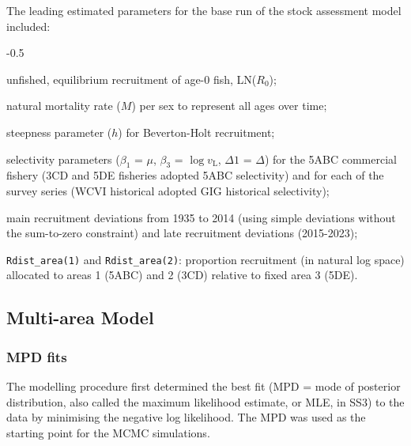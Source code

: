 \documentclass[11pt]{book}
\newcommand{\code}[1]{\texttt{#1}}
\begin{document}
The leading estimated parameters for the base run of the stock assessment model included:
\begin{itemize_csas}{-0.5}{}
	\item unfished, equilibrium recruitment of age-0 fish, LN($R_0$);
	\item natural mortality rate ($M$) per sex to represent all ages over time;
	\item steepness parameter ($h$) for Beverton-Holt recruitment;
	\item selectivity parameters ($\beta_1$ = $\mu$, $\beta_3$ = $\log v_\text{L}$, $\Delta1$ = $\Delta$) for the 5ABC commercial fishery (3CD and 5DE fisheries adopted 5ABC selectivity) and for each of the survey series (WCVI historical adopted GIG historical selectivity);
	\item main recruitment deviations from 1935 to 2014 (using simple deviations without the sum-to-zero constraint) and late recruitment deviations (2015-2023);
	\item \code{Rdist\_area(1)} and \code{Rdist\_area(2)}: proportion recruitment (in natural log space) allocated to areas 1 (5ABC) and 2 (3CD) relative to fixed area 3 (5DE).
\end{itemize_csas}


\subsection{Multi-area Model}
\subsubsection{MPD fits}\label{sss:MPD}


The modelling procedure first determined the best fit (MPD = mode of posterior distribution, also called the maximum likelihood estimate, or MLE, in SS3) to the data by minimising the negative log likelihood.
The MPD was used as the starting point for the MCMC simulations.
\end{document}
